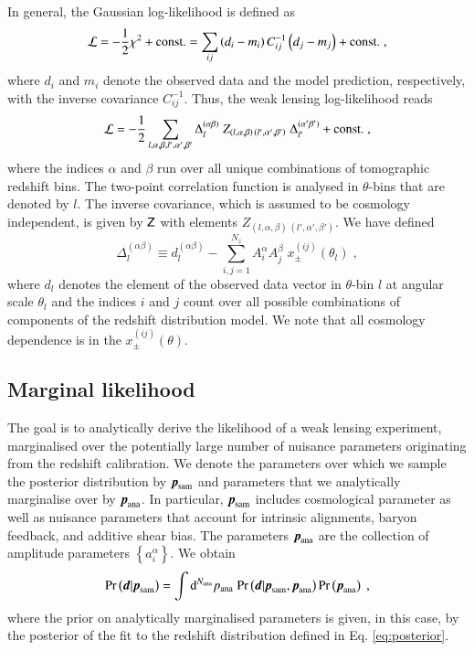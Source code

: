 \documentclass{aa}
\newcommand{\eq}[1]{\begin{equation}  #1 \end{equation}}
\newcommand{\br}[1]{\left( #1 \right)}
\newcommand{\bc}[1]{\left\{ #1 \right\}}
\newcommand{\dd}{{\rm d}}
\newcommand{\pr}{{\rm Pr}}
\begin{document}
In general, the Gaussian log-likelihood is defined as
\eq{
{\cal L}  = -\frac{1}{2} \chi^2 + {\rm const.} = \sum_{ij} \left(d_i - m_i\right) C^{-1}_{ij} \left(d_j - m_j\right) + {\rm const.}\;,
}
where $d_i$ and $m_i$ denote the observed data and the model prediction, respectively, with the inverse covariance $C^{-1}_{ij}$. Thus, the weak lensing log-likelihood reads
\eq{
\label{eq:likelihood}
{\cal L} = - \frac{1}{2} \sum_{l,\alpha,\beta, l', \alpha', \beta'} \Delta_l^{(\alpha \beta)}\; Z_{(l,\alpha,\beta) \,  (l',\alpha',\beta')}\; \Delta_{l'}^{(\alpha' \beta')} + {\rm const.}\;,
}
where the indices $\alpha$ and $\beta$ run over all unique combinations of tomographic redshift bins. The two-point correlation function is analysed in $\theta$-bins that are denoted by $l$. The inverse covariance, which is assumed to be cosmology independent, is given by $\mathsf{Z}$ with elements $Z_{(l,\alpha,\beta) \,  (l',\alpha',\beta')}$. We have defined
\eq{
\label{eq:Delta}
\Delta_l^{(\alpha \beta)} \equiv d_l^{(\alpha \beta)} - \sum_{i,j=1}^{N_z} A_i^\alpha A_j^\beta\; x_\pm^{(ij)}(\theta_l)\;,
}
where $d_l$ denotes the element of the observed data vector in $\theta$-bin $l$ at angular scale $\theta_l$ and the indices $i$ and $j$ count over all possible combinations of components of the redshift distribution model. We note that all cosmology dependence is in the $x_\pm^{(ij)}(\theta)$.

\subsection{Marginal likelihood}
\label{sec:marginalisation}
The goal is to analytically derive the likelihood of a weak lensing experiment, marginalised over the potentially large number of nuisance parameters originating from the redshift calibration. We denote the parameters over which we sample the posterior distribution by $\boldsymbol{p}_{\rm sam}$ and parameters that we analytically marginalise over by $\boldsymbol{p}_{\rm ana}$. In particular, $\boldsymbol{p}_{\rm sam}$ includes cosmological parameter as well as nuisance parameters that account for intrinsic alignments, baryon feedback, and additive shear bias. The parameters $\boldsymbol{p}_{\rm ana}$ are the collection of amplitude parameters $\bc{a_i^\alpha}$. We obtain
\eq{
\pr \br{\boldsymbol{d} | \boldsymbol{p}_{\rm sam}} = \int \dd^{N_{\rm ana}} p_{\rm ana}\; \pr \br{\boldsymbol{d} | \boldsymbol{p}_{\rm sam}, \boldsymbol{p}_{\rm ana}} \pr \br{\boldsymbol{p}_{\rm ana}}\;,
}
where the prior on analytically marginalised parameters is given, in this case, by the posterior of the fit to the redshift distribution defined in Eq. \eqref{eq:posterior}.
\end{document}
